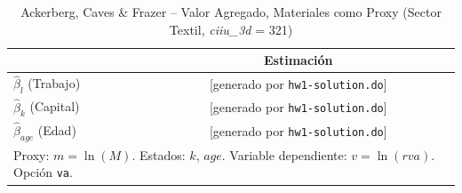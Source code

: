 \begin{table}[H]
\centering
\caption{Ackerberg, Caves \& Frazer -- Valor Agregado, Materiales como Proxy (Sector Textil, \textit{ciiu\_3d} = 321)}
\begin{tabular}{lc}
\toprule
 & Estimación \\
\midrule
$\hat{\beta}_l$ (Trabajo) & [generado por \texttt{hw1-solution.do}] \\
$\hat{\beta}_k$ (Capital) & [generado por \texttt{hw1-solution.do}] \\
$\hat{\beta}_{age}$ (Edad)  & [generado por \texttt{hw1-solution.do}] \\
\bottomrule
\multicolumn{2}{l}{\small Proxy: $m = \ln(M)$. Estados: $k$, $age$. Variable dependiente: $v = \ln(\mathit{rva})$. Opción \texttt{va}.}
\end{tabular}
\end{table}
